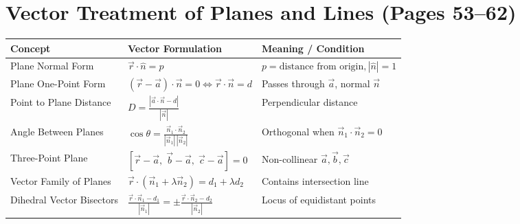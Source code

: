 \section{Vector Treatment of Planes and Lines (Pages 53--62)}

\begin{theorembox}
\begin{center}
\small
\renewcommand{\arraystretch}{1.25}
\setlength{\tabcolsep}{4pt}
\begin{tabular}{|p{3.8cm}|p{5.1cm}|p{5.0cm}|}
\hline
\textbf{Concept} & \textbf{Vector Formulation} & \textbf{Meaning / Condition} \\
\hline
Plane Normal Form & $\vec{r} \cdot \hat{n} = p$ & $p = \text{distance from origin}, |\hat{n}|=1$ \\
Plane One-Point Form & $(\vec{r} - \vec{a}) \cdot \vec{n} = 0 \iff \vec{r} \cdot \vec{n} = d$ & Passes through $\vec{a}$, normal $\vec{n}$ \\
Point to Plane Distance & $\displaystyle D = \frac{|\vec{a} \cdot \vec{n} - d|}{|\vec{n}|}$ & Perpendicular distance \\
Angle Between Planes & $\displaystyle \cos\theta = \frac{\vec{n}_1 \cdot \vec{n}_2}{|\vec{n}_1|\,|\vec{n}_2|}$ & Orthogonal when $\vec{n}_1 \cdot \vec{n}_2 = 0$ \\
Three-Point Plane & $[\vec{r} - \vec{a}, \; \vec{b} - \vec{a}, \; \vec{c} - \vec{a}] = 0$ & Non-collinear $\vec{a}, \vec{b}, \vec{c}$ \\
Vector Family of Planes & $\vec{r} \cdot (\vec{n}_1 + \lambda \vec{n}_2) = d_1 + \lambda d_2$ & Contains intersection line \\
Dihedral Vector Bisectors & $\displaystyle \frac{\vec{r} \cdot \vec{n}_1 - d_1}{|\vec{n}_1|} = \pm \frac{\vec{r} \cdot \vec{n}_2 - d_2}{|\vec{n}_2|}$ & Locus of equidistant points \\
\hline
\end{tabular}
\end{center}
\end{theorembox}

